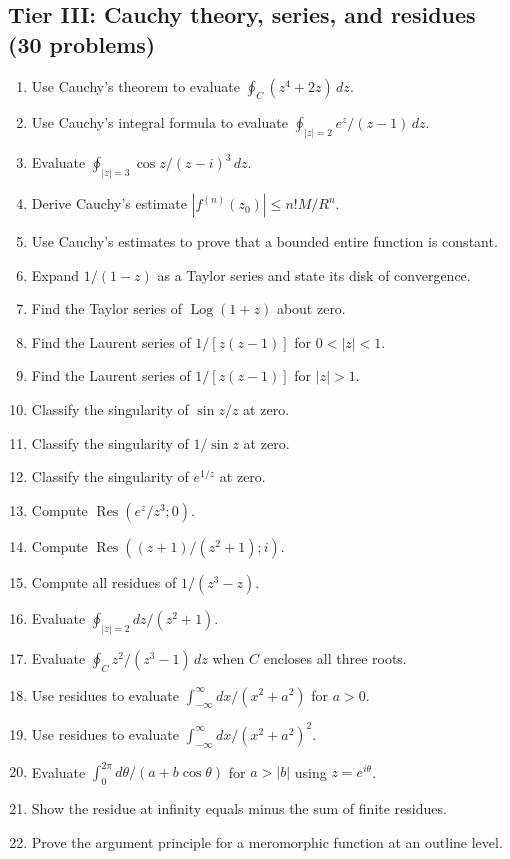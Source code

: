 \subsection*{Tier III: Cauchy theory, series, and residues (30 problems)}
\begin{enumerate}[label=\textbf{\arabic*.},leftmargin=*]
\item Use Cauchy's theorem to evaluate $\oint_C(z^4+2z)\,dz$.
\item Use Cauchy's integral formula to evaluate $\oint_{|z|=2}e^z/(z-1)\,dz$.
\item Evaluate $\oint_{|z|=3}\cos z/(z-i)^3\,dz$.
\item Derive Cauchy's estimate $|f^{(n)}(z_0)|\le n!M/R^n$.
\item Use Cauchy's estimates to prove that a bounded entire function is constant.
\item Expand $1/(1-z)$ as a Taylor series and state its disk of convergence.
\item Find the Taylor series of $\operatorname{Log}(1+z)$ about zero.
\item Find the Laurent series of $1/[z(z-1)]$ for $0<|z|<1$.
\item Find the Laurent series of $1/[z(z-1)]$ for $|z|>1$.
\item Classify the singularity of $\sin z/z$ at zero.
\item Classify the singularity of $1/\sin z$ at zero.
\item Classify the singularity of $e^{1/z}$ at zero.
\item Compute $\operatorname{Res}(e^z/z^3;0)$.
\item Compute $\operatorname{Res}((z+1)/(z^2+1);i)$.
\item Compute all residues of $1/(z^3-z)$.
\item Evaluate $\oint_{|z|=2}dz/(z^2+1)$.
\item Evaluate $\oint_C z^2/(z^3-1)\,dz$ when $C$ encloses all three roots.
\item Use residues to evaluate $\int_{-\infty}^{\infty}dx/(x^2+a^2)$ for $a>0$.
\item Use residues to evaluate $\int_{-\infty}^{\infty}dx/(x^2+a^2)^2$.
\item Evaluate $\int_0^{2\pi}d\theta/(a+b\cos\theta)$ for $a>|b|$ using $z=e^{i\theta}$.
\item Show the residue at infinity equals minus the sum of finite residues.
\item Prove the argument principle for a meromorphic function at an outline level.

\end{enumerate}
